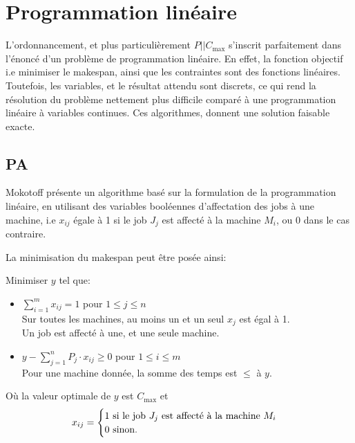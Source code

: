 \documentclass[a4paper,12pt]{report}
\theoremstyle{plain}				%
\theoremstyle{definition}				%
\newcommand\problemGrahamP{$P||C_{\max}$\xspace}
\newcommand{\tdi}[1]{\todo[inline]{{#1}}{}}
\newcommand{\lp}[1]{\todo[author=LP,color=yellow,inline]{#1}}
\begin{document}
\section{Programmation linéaire}

L'ordonnancement, et plus particulièrement \problemGrahamP s'inscrit
parfaitement dans l'énoncé d'un problème de programmation linéaire.
En effet, la fonction objectif i.e minimiser le makespan, ainsi que
les contraintes sont des fonctions linéaires.
Toutefois, les variables, et le résultat attendu sont discrets, ce qui
rend la résolution du problème nettement plus difficile comparé à une
programmation linéaire à variables continues.
Ces algorithmes, donnent une solution faisable exacte.

\subsection{PA} %

Mokotoff \cite{mokoto1999scheduling} présente un algorithme basé sur
la formulation de la programmation linéaire, en utilisant des
variables booléennes d'affectation des jobs à une machine, i.e $x_{ij}$ égale à 1 si le job $J_j$ est affecté à la machine $M_i$, ou 0 dans le cas contraire.

\bigskip
La minimisation du makespan peut être posée ainsi:

Minimiser $y$ tel que:

\begin{itemize}
\item $\sum_{i=1}^{m}x_{ij}=1$ \quad pour $1 \leq j \leq n$ 		\\
Sur toutes les machines, au moins un et un seul $x_j$ est égal à 1.	\\
Un job est affecté à une, et une seule machine.

\item $y-\sum_{j=1}^{n}P_j \cdot x_{ij} \geq 0$ \quad pour $1 \leq i \leq m$ \\
Pour une machine donnée, la somme des temps est $\leq$ à $y$.
\end{itemize}

\bigskip
Où la valeur optimale de $y$ est $C_{\max}$
et
\[
  x_{ij} =
  \begin{cases}
    1 \textnormal{ si le job $J_j$ est affecté à la machine $M_i$}\\
    0 \textnormal{ sinon.}\\
  \end{cases}
\]
\end{document}
